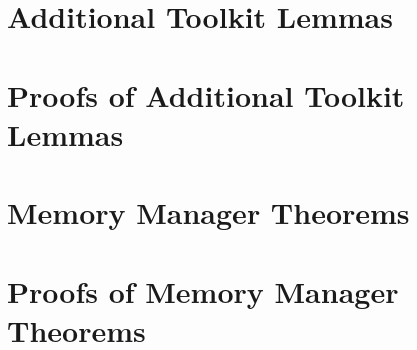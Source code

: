 \documentclass[a4paper,10pt]{report}
\begin{document}
\section{Additional Toolkit Lemmas}
\label{additional-lemmas}
\normalsize

 

\section{Proofs of Additional Toolkit Lemmas}
\label{additional-lemmas-proofs}
\scriptsize





\section{Memory Manager Theorems}
\label{memory-manager-theorems}
\normalsize



\section{Proofs of Memory Manager Theorems}
\label{memory-manager-proofs}
\scriptsize


\end{document}

